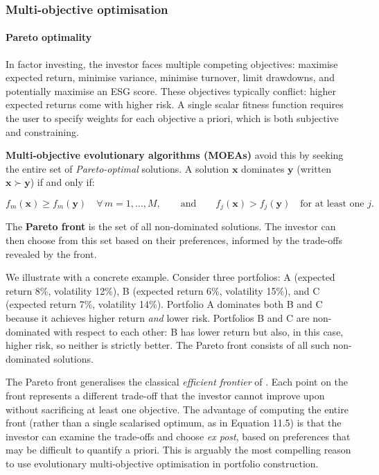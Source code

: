\subsubsection{Multi-objective optimisation}

\paragraph{Pareto optimality}

In factor investing, the investor faces multiple competing objectives: maximise expected return, minimise variance, minimise turnover, limit drawdowns, and potentially maximise an ESG score. These objectives typically conflict: higher expected returns come with higher risk. A single scalar fitness function requires the user to specify weights for each objective a priori, which is both subjective and constraining.

\textbf{Multi-objective evolutionary algorithms (MOEAs)} avoid this by seeking the entire set of \textit{Pareto-optimal} solutions. A solution $\mathbf{x}$ dominates $\mathbf{y}$ (written $\mathbf{x} \succ \mathbf{y}$) if and only if:

\begin{equation}
f_m(\mathbf{x}) \geq f_m(\mathbf{y}) \quad \forall \, m = 1, \ldots, M, \qquad \text{and} \qquad f_j(\mathbf{x}) > f_j(\mathbf{y}) \quad \text{for at least one } j. \tag{11.6}
\end{equation}

The \textbf{Pareto front} is the set of all non-dominated solutions. The investor can then choose from this set based on their preferences, informed by the trade-offs revealed by the front.

We illustrate with a concrete example. Consider three portfolios: A (expected return 8\%, volatility 12\%), B (expected return 6\%, volatility 15\%), and C (expected return 7\%, volatility 14\%). Portfolio A dominates both B and C because it achieves higher return \textit{and} lower risk. Portfolios B and C are non-dominated with respect to each other: B has lower return but also, in this case, higher risk, so neither is strictly better. The Pareto front consists of all such non-dominated solutions.

The Pareto front generalises the classical \textit{efficient frontier} of \cite{markowitz1952portfolio}. Each point on the front represents a different trade-off that the investor cannot improve upon without sacrificing at least one objective. The advantage of computing the entire front (rather than a single scalarised optimum, as in Equation 11.5) is that the investor can examine the trade-offs and choose \textit{ex post}, based on preferences that may be difficult to quantify a priori. This is arguably the most compelling reason to use evolutionary multi-objective optimisation in portfolio construction.

